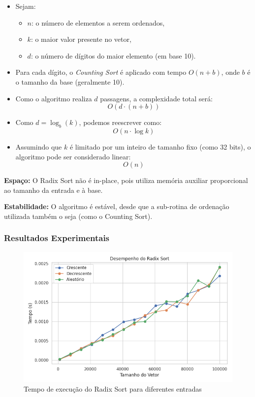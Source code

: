 \begin{itemize}
    \item Sejam:
    \begin{itemize}
        \item \(n\): o número de elementos a serem ordenados,
        \item \(k\): o maior valor presente no vetor,
        \item \(d\): o número de dígitos do maior elemento (em base 10).
    \end{itemize}
    
    \item Para cada dígito, o \textit{Counting Sort} é aplicado com tempo \(O(n + b)\), onde \(b\) é o tamanho da base (geralmente 10).
    
    \item Como o algoritmo realiza \(d\) passagens, a complexidade total será:
    \[
    O(d \cdot (n + b))
    \]

    \item Como \(d = \log_b(k)\), podemos reescrever como:
    \[
    O(n \cdot \log k)
    \]

    \item Assumindo que \(k\) é limitado por um inteiro de tamanho fixo (como 32 bits), o algoritmo pode ser considerado linear:
    \[
    O(n)
    \]
\end{itemize}

\textbf{Espaço:} O Radix Sort não é in-place, pois utiliza memória auxiliar proporcional ao tamanho da entrada e à base.

\textbf{Estabilidade:} O algoritmo é estável, desde que a sub-rotina de ordenação utilizada também o seja (como o Counting Sort).

\subsubsection{Resultados Experimentais}
\begin{figure}[H]
    \centering
    \includegraphics[width=1\textwidth]{../codigos/resultados/radix_grafico.png}
    \caption{Tempo de execução do Radix Sort para diferentes entradas}
    \label{fig:radix-grafico}
\end{figure}

